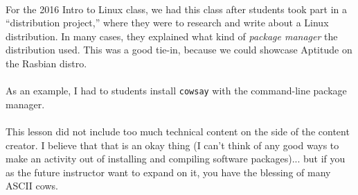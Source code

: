 \documentclass[11pt]{article}
\begin{document}
	\paragraph{} For the 2016 Intro to Linux class, we had this class after students took part in a ``distribution project,'' where they were to research and write about a Linux distribution. In many cases, they explained what kind of \textit{package manager} the distribution used. This was a good tie-in, because we could showcase Aptitude on the Rasbian distro.

	\paragraph{} As an example, I had to students install \texttt{cowsay} with the command-line package manager.

	\paragraph{}

	\begin{center}
		\graphicspath{ {.} }
		\centering
	\end{center}	


	\paragraph{} This lesson did not include too much technical content on the side of the content creator. I believe that that is an okay thing (I can't think of any good ways to make an activity out of installing and compiling software packages)... but if you as the future instructor want to expand on it, you have the blessing of many ASCII cows.

	\paragraph{} \paragraph{}
\end{document}
